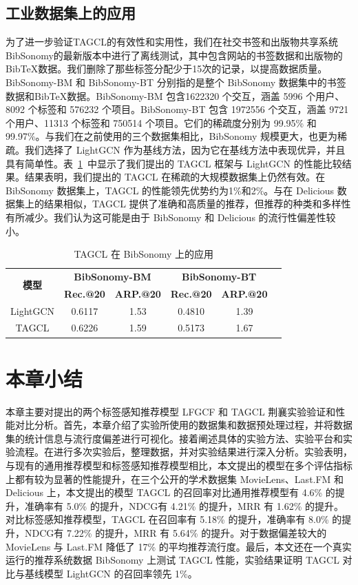 \subsection{工业数据集上的应用}
为了进一步验证TAGCL的有效性和实用性，我们在社交书签和出版物共享系统BibSonomy的最新版本中进行了离线测试\cite{benz_bibsonomy_2010}，其中包含网站的书签数据和出版物的BibTeX数据。我们删除了那些标签分配少于15次的记录，以提高数据质量。BibSonomy-BM 和 BibSonomy-BT 分别指的是整个 BibSonomy 数据集中的书签数据和BibTeX数据。BibSonomy-BM 包含1622320 个交互，涵盖 5996 个用户、8092 个标签和 576232 个项目。BibSonomy-BT 包含 1972556 个交互，涵盖 9721 个用户、11313 个标签和 750514 个项目。它们的稀疏度分别为 99.95\% 和 99.97\%。与我们在之前使用的三个数据集相比，BibSonomy 规模更大，也更为稀疏。我们选择了 LightGCN 作为基线方法，因为它在基线方法中表现优异，并且具有简单性。表~\ref{tab:bibsonomy}~中显示了我们提出的 TAGCL 框架与 LightGCN 的性能比较结果。结果表明，我们提出的 TAGCL 在稀疏的大规模数据集上仍然有效。在 BibSonomy 数据集上，TAGCL 的性能领先优势约为1\%和2\%。与在 Delicious 数据集上的结果相似，TAGCL 提供了准确和高质量的推荐，但推荐的种类和多样性有所减少。我们认为这可能是由于 BibSonomy 和 Delicious 的流行性偏差性较小。

\begin{table}[!h]
  \centering
  \caption{TAGCL 在 BibSonomy 上的应用}
  \label{tab:bibsonomy}
  \begin{tabular}{c|cc|ccc}
    \toprule
    \multirow{2}{*}{\textbf{模型}} &
    \multicolumn{2}{c|}{\textbf{BibSonomy-BM}} &
    \multicolumn{2}{c}{\textbf{BibSonomy-BT}} \\
    \cline{2-5} 
    & \textbf{Rec.@20} & \textbf{ARP.@20} & \textbf{Rec.@20} & \textbf{ARP.@20} \\
    \midrule
    LightGCN & 0.6117 & 1.53 & 0.4810 & 1.39 \\
    TAGCL & 0.6226 & 1.59 & 0.5173 & 1.67 \\
    \bottomrule
  \end{tabular}
\end{table}

\section{本章小结}
本章主要对提出的两个标签感知推荐模型 LFGCF 和 TAGCL 荆襄实验验证和性能对比分析。首先，本章介绍了实验所使用的数据集和数据预处理过程，并将数据集的统计信息与流行度偏差进行可视化。接着阐述具体的实验方法、实验平台和实验流程。在进行多次实验后，整理数据，并对实验结果进行深入分析。实验表明，与现有的通用推荐模型和标签感知推荐模型相比，本文提出的模型在多个评估指标上都有较为显著的性能提升，在三个公开的学术数据集 MovieLens、Last.FM 和 Delicious 上，本文提出的模型 TAGCL 的召回率对比通用推荐模型有 4.6\% 的提升，准确率有 5.0\% 的提升，NDCG有 4.21\% 的提升，MRR 有 1.62\% 的提升。对比标签感知推荐模型，TAGCL 在召回率有 5.18\% 的提升，准确率有 8.0\% 的提升，NDCG有 7.22\% 的提升，MRR 有 5.64\% 的提升。对于数据偏差较大的 MovieLens 与 Last.FM 降低了 17\% 的平均推荐流行度。最后，本文还在一个真实运行的推荐系统数据 BibSonomy 上测试 TAGCL 性能，实验结果证明 TAGCL 对比与基线模型 LightGCN 的召回率领先 1\%。

% 
